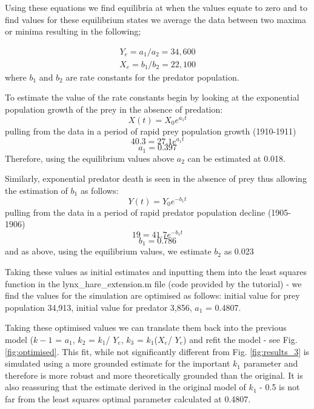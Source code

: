 \documentclass{article}
\begin{document}
Using these equations we find equilibria at when the values equate to zero and to find values for these equilibrium states we average the data between two maxima or minima resulting in the following;

\begin{eqnarray*}
     Y_e = a_1/a_2 = 34,600
\end{eqnarray*}
\begin{eqnarray*}
     X_e = b_1/b_2 = 22,100
\end{eqnarray*}
where $b_1$ and $b_2$ are rate constants for the predator population. 

To estimate the value of the rate constants begin by looking at the exponential population growth of the prey in the absence of predation:
 \begin{equation*}
    X(t) = X_0e^{a_1t}
\end{equation*}
pulling from the data in a period of rapid prey population growth (1910-1911)
 \begin{equation*}
    40.3 = 27.1e^{a_1t}
\end{equation*}
 \begin{equation*}
    a_1 = 0.397
\end{equation*}
Therefore, using the equilibrium values above $a_2$ can be estimated at 0.018.

Similarly, exponential predator death is seen in the absence of prey thus allowing the estimation of $b_1$ as follows:
\begin{equation*}
    Y(t) = Y_0e^{-b_1t}
\end{equation*}
pulling from the data in a period of rapid predator population decline (1905-1906)
 \begin{equation*}
    19 = 41.7e^{-b_1t}
\end{equation*}
 \begin{equation*}
    b_1 = 0.786
\end{equation*}
and as above, using the equilibrium values, we estimate $b_2$ as 0.023

Taking these values as initial estimates and inputting them into the least squares function in the lynx\_hare\_extension.m file (code provided by the tutorial) - we find the values for the simulation are optimised as follows: initial value for prey population 34,913, initial value for predator 3,856, $a_1$ = 0.4807. 

Taking these optimised values we can translate them back into the previous model ($k-1$ = $a_1$, $k_2$ = $k_1$/ $Y_e$, $k_3$ = $k_1$($X_e$/ $Y_e$) and refit the model - see Fig. \ref{fig:optimised}. This fit, while not significantly different from Fig. \ref{fig:results_3} is simulated using a more grounded estimate for the important $k_1$ parameter and therefore is more robust and more theoretically grounded than the original. It is also reassuring that the estimate derived in the original model of $k_1$ - 0.5 is not far from the least squares optimal parameter calculated at 0.4807.
\end{document}
